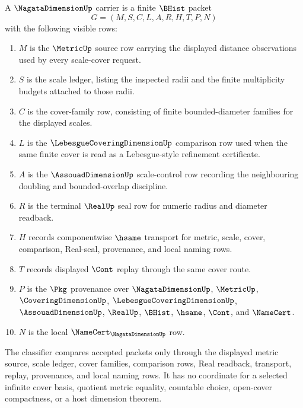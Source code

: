 \begin{definition}
\label{def:nagata-dimension-carrier}
A $\NagataDimensionUp$ carrier is a finite $\BHist$ packet
$$
G=(M,S,C,L,A,R,H,T,P,N)
$$
with the following visible rows:
\begin{enumerate}
\item $M$ is the $\MetricUp$ source row carrying the displayed distance observations used by every scale-cover request.
\item $S$ is the scale ledger, listing the inspected radii and the finite multiplicity budgets attached to those radii.
\item $C$ is the cover-family row, consisting of finite bounded-diameter families for the displayed scales.
\item $L$ is the $\LebesgueCoveringDimensionUp$ comparison row used when the same finite cover is read as a Lebesgue-style refinement certificate.
\item $A$ is the $\AssouadDimensionUp$ scale-control row recording the neighbouring doubling and bounded-overlap discipline.
\item $R$ is the terminal $\RealUp$ seal row for numeric radius and diameter readback.
\item $H$ records componentwise $\hsame$ transport for metric, scale, cover, comparison, Real-seal, provenance, and local naming rows.
\item $T$ records displayed $\Cont$ replay through the same cover route.
\item $P$ is the $\Pkg$ provenance over $\NagataDimensionUp$, $\MetricUp$, $\CoveringDimensionUp$, $\LebesgueCoveringDimensionUp$, $\AssouadDimensionUp$, $\RealUp$, $\BHist$, $\hsame$, $\Cont$, and $\NameCert$.
\item $N$ is the local $\NameCert_{\NagataDimensionUp}$ row.
\end{enumerate}
The classifier compares accepted packets only through the displayed metric source, scale ledger, cover families, comparison rows, Real readback, transport, replay, provenance, and local naming rows. It has no coordinate for a selected infinite cover basis, quotient metric equality, countable choice, open-cover compactness, or a host dimension theorem.
\end{definition}

